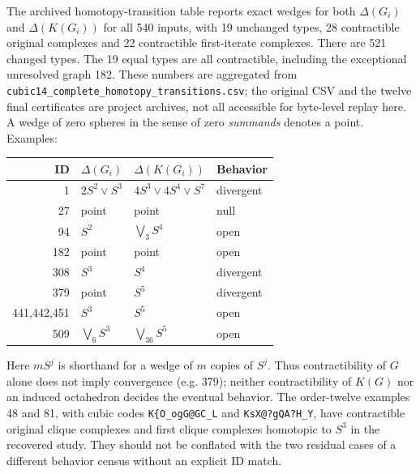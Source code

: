 \documentclass[11pt,a4paper]{article}
\theoremstyle{definition}\newtheorem{definition}[theorem]{Definition}\newtheorem{example}[theorem]{Example}
\theoremstyle{remark}\newtheorem{remark}[theorem]{Remark}
\begin{document}
The archived homotopy-transition table reports exact wedges for both \(\Delta(G_i)\) and \(\Delta(K(G_i))\) for all 540 inputs, with 19 unchanged types, 28 contractible original complexes and 22 contractible first-iterate complexes. There are 521 changed types. The 19 equal types are all contractible, including the exceptional unresolved graph 182. These numbers are aggregated from \nolinkurl{cubic14_complete_homotopy_transitions.csv}; the original CSV and the twelve final certificates are project archives, not all accessible for byte-level replay here. A wedge of zero spheres in the sense of zero \emph{summands} denotes a point. Examples:
\begin{center}\begin{tabular}{rlll}\toprule
ID & \(\Delta(G_i)\) & \(\Delta(K(G_i))\) & Behavior\\\midrule
1 & \(2S^2\vee S^3\)&\(4S^3\vee4S^4\vee S^7\)& divergent\\
27&point&point&null\\
94&\(S^2\)&\(\bigvee_3 S^4\)&open\\
182&point&point&open\\
308&\(S^3\)&\(S^4\)&divergent\\
379&point&\(S^5\)&divergent\\
441,442,451&\(S^3\)&\(S^5\)&open\\
509&\(\bigvee_6 S^3\)&\(\bigvee_{36}S^5\)&open\\\bottomrule\end{tabular}\end{center}
Here \(mS^j\) is shorthand for a wedge of \(m\) copies of \(S^j\). Thus contractibility of \(G\) alone does not imply convergence (e.g. 379); neither contractibility of \(K(G)\) nor an induced octahedron decides the eventual behavior. The order-twelve examples 48 and 81, with cubic codes \verb|K{O_ogG@GC_L| and \verb|KsX@?gQA?H_Y|, have contractible original clique complexes and first clique complexes homotopic to \(S^3\) in the recovered study. They should not be conflated with the two residual cases of a different behavior census without an explicit ID match.
\end{document}

